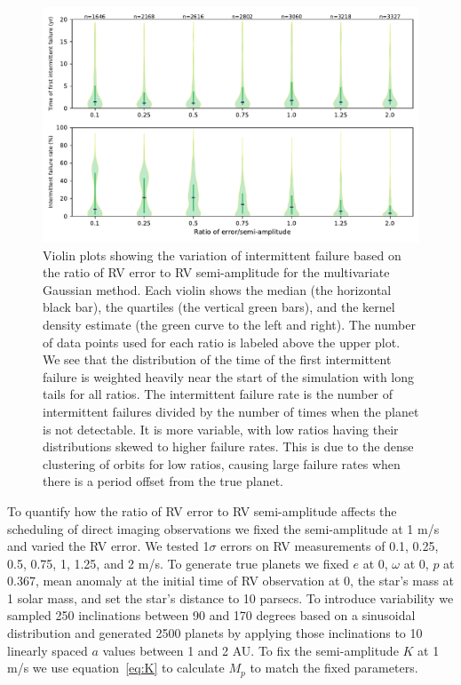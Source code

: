 \begin{figure}[htpb]
    \centering
    \includegraphics[width=\linewidth]{ch1/figures/violin_plots.pdf}
    \caption{Violin plots showing the variation of intermittent failure based on the ratio of RV
        error to RV semi-amplitude for the multivariate Gaussian method. Each violin shows the
        median (the horizontal black bar), the quartiles (the vertical green bars), and the kernel
        density estimate (the green curve to the left and right). The number of data points used for
        each ratio is labeled above the upper plot. We see that the distribution of the time of the
        first intermittent failure is weighted heavily near the start of the simulation with long
        tails for all ratios.  The intermittent failure rate is the number of intermittent failures
        divided by the number of times when the planet is not detectable. It is more variable, with
        low ratios having their distributions skewed to higher failure rates.  This is due to the
        dense clustering of orbits for low ratios, causing large failure rates when there is a
        period offset from the true planet.}%
    \label{fig:violin}
\end{figure}

To quantify how the ratio of RV error to RV semi-amplitude affects the scheduling of direct
imaging observations we fixed the semi-amplitude at 1 m/s and varied the RV error. We tested 
1$\sigma$ errors on RV measurements of 0.1, 0.25, 0.5, 0.75, 1, 1.25, and 2 m/s.  To generate true
planets we fixed $e$ at 0, $\omega$ at 0, $p$ at 0.367, mean anomaly at the initial time of RV
observation at 0, the star's mass at 1 solar mass, and set the star's distance to 10 parsecs. To
introduce variability we sampled 250 inclinations between 90 and 170 degrees based on a sinusoidal
distribution and generated 2500 planets by applying those inclinations to 10 linearly spaced $a$
values between 1 and 2 AU. To fix the semi-amplitude $K$ at 1 m/s we use equation~\ref{eq:K} to
calculate $M_p$ to match the fixed parameters. 

